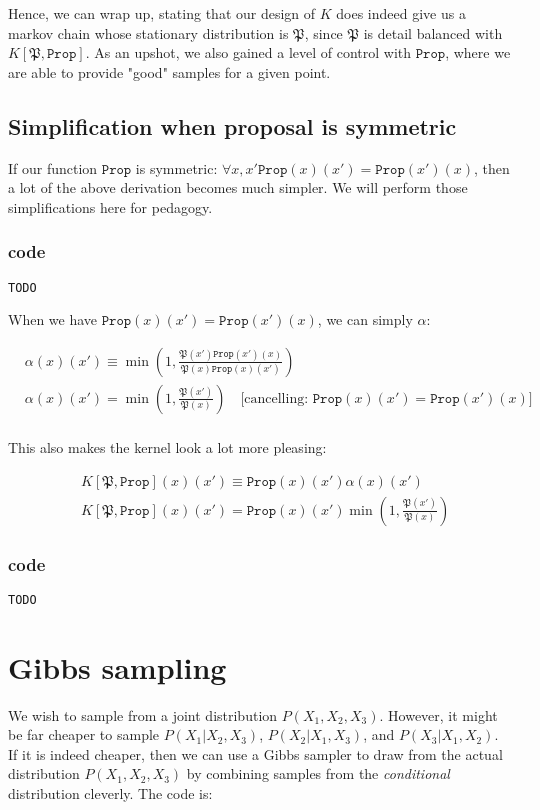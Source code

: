 \documentclass[titlepage]{article}
\renewcommand{\P}{\mathfrak{P}}
\newcommand{\Prop}{\texttt{Prop}}
\begin{document}
Hence, we can wrap up, stating that our design of $K$ does indeed give us a
markov chain whose stationary distribution is $\P$, since $\P$ is detail
balanced with $K[\P, \Prop]$. As an upshot, we also gained a level of control
with $\Prop$, where we are able to provide "good" samples for a given point.

\subsection{Simplification when proposal is symmetric}
If our function $\Prop$ is symmetric: $\forall x, x' \Prop(x)(x') = \Prop(x')(x)$,
then a lot of the above derivation becomes much simpler. We will perform those
simplifications here for pedagogy.


\subsubsection{code}

\begin{verbatim}
TODO
\end{verbatim}

When we have $\Prop(x)(x') = \Prop(x')(x)$, we can simply $\alpha$:

\begin{align*}
&\alpha(x)(x') \equiv   \min\left(1, \frac{\P(x')\Prop(x')(x)}{\P(x)\Prop(x)(x')} \right) \\
&\alpha(x)(x') = \min\left(1, \frac{\P(x')}{\P(x)} \right) \quad \text{[cancelling: $\Prop(x)(x') = \Prop(x')(x)$]}\\ 
\end{align*}

This also makes the kernel look a lot more pleasing:

\begin{align*}
&K[\P, \Prop](x)(x') \equiv \Prop(x)(x') \alpha(x)(x') \\
&K[\P, \Prop](x)(x') = \Prop(x)(x') \min\left(1, \frac{\P(x')}{\P(x)} \right) 
\end{align*}

\subsubsection{code}

\begin{verbatim}
TODO
\end{verbatim}

\section{Gibbs sampling}
We wish to sample from a joint distribution $P(X_1, X_2, X_3)$. However, it might
be far cheaper to sample $P(X_1 | X_2, X_3)$, $P(X_2 | X_1, X_3)$, and
$P(X_3 | X_1, X_2)$. If it is indeed cheaper, then we can use a Gibbs sampler
to draw from the actual distribution $P(X_1, X_2, X_3)$ by combining samples
from the \emph{conditional} distribution cleverly. The code is:
\end{document}
